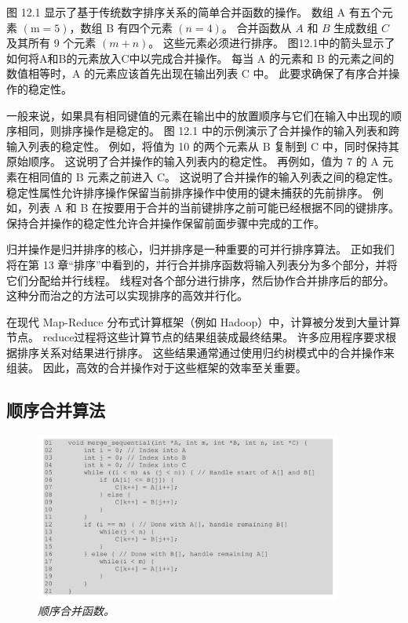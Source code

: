 图 12.1 显示了基于传统数字排序关系的简单合并函数的操作。 
数组 A 有五个元素 $(\mathrm{m}=5)$，数组 B 有四个元素 $(n=4)$。 
合并函数从 $A$ 和 $B$ 生成数组 $C$ 及其所有 9 个元素 $(m+n)$。 这些元素必须进行排序。 
图12.1中的箭头显示了如何将A和B的元素放入$\mathrm{C}$中以完成合并操作。 
每当 $\mathrm{A}$ 的元素和 B 的元素之间的数值相等时，A 的元素应该首先出现在输出列表 C 中。
此要求确保了有序合并操作的稳定性。

一般来说，如果具有相同键值的元素在输出中的放置顺序与它们在输入中出现的顺序相同，则排序操作是稳定的。 
图 12.1 中的示例演示了合并操作的输入列表和跨输入列表的稳定性。 
例如，将值为 10 的两个元素从 B 复制到 $\mathrm{C}$ 中，同时保持其原始顺序。 
这说明了合并操作的输入列表内的稳定性。 再例如，值为 7 的 A 元素在相同值的 $\mathrm{B}$ 元素之前进入 $\mathrm{C}$。 
这说明了合并操作的输入列表之间的稳定性。 稳定性属性允许排序操作保留当前排序操作中使用的键未捕获的先前排序。 
例如，列表 A 和 B 在按要用于合并的当前键排序之前可能已经根据不同的键排序。 
保持合并操作的稳定性允许合并操作保留前面步骤中完成的工作。

归并操作是归并排序的核心，归并排序是一种重要的可并行排序算法。 
正如我们将在第 13 章“排序”中看到的，并行合并排序函数将输入列表分为多个部分，并将它们分配给并行线程。 
线程对各个部分进行排序，然后协作合并排序后的部分。 这种分而治之的方法可以实现排序的高效并行化。

在现代 Map-Reduce 分布式计算框架（例如 Hadoop）中，计算被分发到大量计算节点。 
reduce过程将这些计算节点的结果组装成最终结果。 许多应用程序要求根据排序关系对结果进行排序。 
这些结果通常通过使用归约树模式中的合并操作来组装。 因此，高效的合并操作对于这些框架的效率至关重要。

\subsection{顺序合并算法}
\begin{figure}[H]
	\centering
	\includegraphics[width=0.9\textwidth]{figs/F12.2.png}
	\caption{\textit{顺序合并函数。}}
\end{figure}

